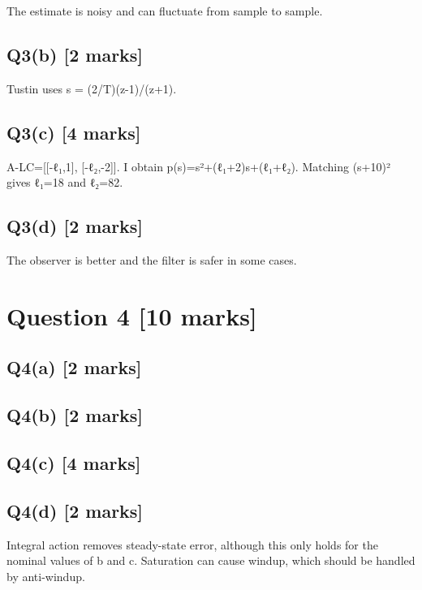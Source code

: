 \documentclass[11pt,a4paper]{article}
\begin{document}
The estimate is noisy and can fluctuate from sample to sample.

\subsection*{Q3(b) \hfill [2 marks]}

Tustin uses s = (2/T)(z-1)/(z+1).

\subsection*{Q3(c) \hfill [4 marks]}

A-LC=[[-ℓ₁,1], [-ℓ₂,-2]].
I obtain p(s)=s²+(ℓ₁+2)s+(ℓ₁+ℓ₂).
Matching (s+10)² gives ℓ₁=18 and ℓ₂=82.

\subsection*{Q3(d) \hfill [2 marks]}

The observer is better and the filter is safer in some cases.

\section*{Question 4 \hfill [10 marks]}
\subsection*{Q4(a) \hfill [2 marks]}

\vspace{2mm}

\subsection*{Q4(b) \hfill [2 marks]}

\vspace{2mm}

\subsection*{Q4(c) \hfill [4 marks]}

\vspace{2mm}

\subsection*{Q4(d) \hfill [2 marks]}

Integral action removes steady-state error, although this only holds for the nominal values of b and c.
Saturation can cause windup, which should be handled by anti-windup.
\end{document}
